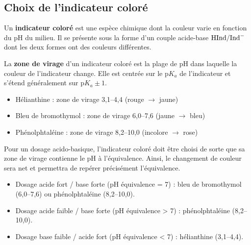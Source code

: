 \subsection{Choix de l'indicateur coloré}

\begin{definition}
Un \textbf{indicateur coloré} est une espèce chimique dont la couleur varie en fonction du pH du milieu. Il se présente sous la forme d'un couple acide-base $\ce{HInd/Ind-}$ dont les deux formes ont des couleurs différentes.
\end{definition}

\begin{propriete}
La \textbf{zone de virage} d'un indicateur coloré est la plage de pH dans laquelle la couleur de l'indicateur change. Elle est centrée sur le $\mathrm{p}K_a$ de l'indicateur et s'étend généralement sur $\mathrm{p}K_a \pm 1$.
\end{propriete}

\begin{exemple}
\begin{itemize}
    \item Hélianthine : zone de virage 3,1--4,4 (rouge $\to$ jaune)
    \item Bleu de bromothymol : zone de virage 6,0--7,6 (jaune $\to$ bleu)
    \item Phénolphtaléine : zone de virage 8,2--10,0 (incolore $\to$ rose)
\end{itemize}
\end{exemple}

\begin{loi}
Pour un dosage acido-basique, l'indicateur coloré doit être choisi de sorte que sa zone de virage contienne le pH à l'équivalence. Ainsi, le changement de couleur sera net et permettra de repérer précisément l'équivalence.
\end{loi}

\begin{exemple}
\begin{itemize}
    \item Dosage acide fort / base forte (pH équivalence = 7) : bleu de bromothymol (6,0--7,6) ou phénolphtaléine (8,2--10,0).
    \item Dosage acide faible / base forte (pH équivalence > 7) : phénolphtaléine (8,2--10,0).
    \item Dosage base faible / acide fort (pH équivalence < 7) : hélianthine (3,1--4,4).
\end{itemize}
\end{exemple}

